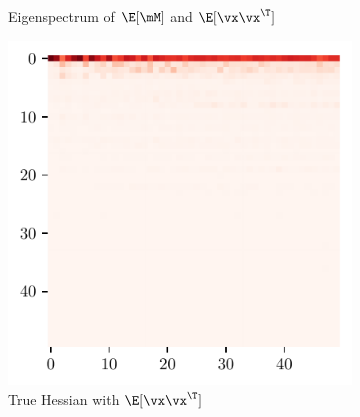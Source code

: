 \begin{figure}[H]
\begin{subfigure}[b]{0.24\textwidth}
        \caption{Eigenspectrum of $\E[\mM]$ and $\E[\vx\vx^\T]$}
        \label{fig:app_adexp_vgg2_sig}
    \end{subfigure}%
    \begin{subfigure}[b]{0.24\textwidth}
        \centering
        \captionsetup{justification=centering}
        \includegraphics[width=\textwidth]{Appendix_Figures/Overlap_large_model/FailExplanation/VGGlate/xxT_Trueest_real_corr_expand_t50_CIFAR10_Exp1_VGG11W200_fxlr0.01_E-1_features.3.pdf}
        \caption{True Hessian with $\E[\vx\vx^\T]$}
        \label{fig:app_adexp_vgg2_corr_real}
    \end{subfigure}
    \begin{subfigure}[b]{0.24\textwidth}
        \centering
        \captionsetup{justification=centering}

\end{subfigure}
\end{figure}
